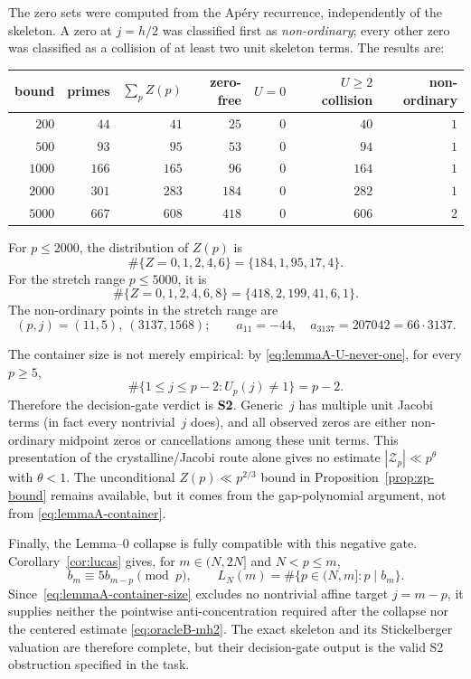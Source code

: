 The zero sets were computed from the Ap\'ery recurrence, independently
of the skeleton.  A zero at $j=h/2$ was classified first as
\emph{non-ordinary}; every other zero was classified as a collision of
at least two unit skeleton terms.  The results are:
\begin{center}
\begin{tabular}{r|r|r|r|r|r|r}
 bound & primes & $\sum_p Z(p)$ & zero-free & $U=0$ & $U\geq2$ collision
       & non-ordinary \\ \hline
 $200$  & $44$  & $41$  & $25$  & $0$ & $40$  & $1$ \\
 $500$  & $93$  & $95$  & $53$  & $0$ & $94$  & $1$ \\
 $1000$ & $166$ & $165$ & $96$  & $0$ & $164$ & $1$ \\
 $2000$ & $301$ & $283$ & $184$ & $0$ & $282$ & $1$ \\
 $5000$ & $667$ & $608$ & $418$ & $0$ & $606$ & $2$
\end{tabular}
\end{center}
For $p\leq2000$, the distribution of $Z(p)$ is
\[
 \#\{Z=0,1,2,4,6\}=\{184,1,95,17,4\}.
\]
For the stretch range $p\leq5000$, it is
\[
 \#\{Z=0,1,2,4,6,8\}=\{418,2,199,41,6,1\}.
\]
The non-ordinary points in the stretch range are
\[
 (p,j)=(11,5),\ (3137,1568);
 \qquad a_{11}=-44,
 \quad a_{3137}=207042=66\cdot3137.
\]

The container size is not merely empirical: by
\eqref{eq:lemmaA-U-never-one}, for every $p\geq5$,
\begin{equation}
 \#\{1\leq j\leq p-2:U_p(j)\ne1\}=p-2.
 \label{eq:lemmaA-container-size}
\end{equation}
Therefore the decision-gate verdict is \textbf{S2}.  Generic~$j$ has
multiple unit Jacobi terms (in fact every nontrivial~$j$ does), and all
observed zeros are either non-ordinary midpoint zeros or cancellations
among these unit terms.  This presentation of the crystalline/Jacobi
route alone gives no estimate $|\mathcal Z_p|\ll p^\theta$ with
$\theta<1$.  The unconditional
$Z(p)\ll p^{2/3}$ bound in Proposition~\ref{prop:zp-bound} remains
available, but it comes from the gap-polynomial argument, not from
\eqref{eq:lemmaA-container}.

Finally, the Lemma--0 collapse is fully compatible with this negative
gate.  Corollary~\ref{cor:lucas} gives, for $m\in(N,2N]$ and
$N<p\leq m$,
\[
 b_m\equiv5b_{m-p}\pmod p,
 \qquad
 L_N(m)=\#\{p\in(N,m]:p\mid b_m\}.
\]
Since~\eqref{eq:lemmaA-container-size} excludes no nontrivial affine
target $j=m-p$, it supplies neither the pointwise anti-concentration
required after the collapse nor the centered estimate
\eqref{eq:oracleB-mh2}.  The exact skeleton and its Stickelberger
valuation are therefore complete, but their decision-gate output is
the valid S2 obstruction specified in the task.
